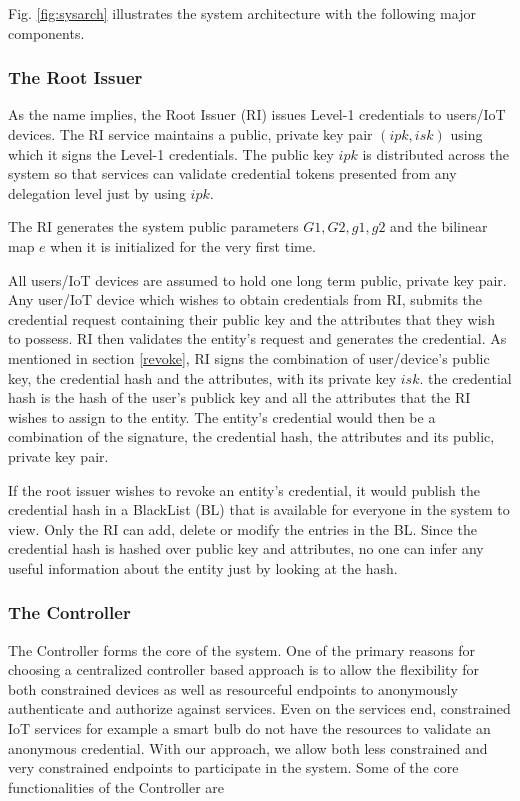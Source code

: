 \documentclass[journal]{IEEEtran}
\begin{document}
Fig. \ref{fig:sysarch} illustrates the system architecture with the following major components.

\subsubsection{The Root Issuer}
As the name implies, the Root Issuer (RI) issues Level-1 credentials to users/IoT devices. The RI service maintains a public, private key pair $(ipk,isk)$ using which it signs the Level-1 credentials. The public key $ipk$ is distributed across the system so that services can validate credential tokens presented from any delegation level just by using $ipk$.

The RI generates the system public parameters $G1, G2, g1, g2$ and the bilinear map $e$ when it is initialized for the very first time.

All users/IoT devices are assumed to hold one long term public, private key pair. Any user/IoT device which wishes to obtain credentials from RI, submits the credential request containing their public key and the attributes that they wish to possess. RI then validates the entity's request and generates the credential. As mentioned in section \ref{revoke}, RI signs the combination of user/device's public key, the credential hash and the attributes, with its private key $isk$. the credential hash is the hash of the user's publick key and all the attributes that the RI wishes to assign to the entity. The entity's credential would then be a combination of the signature, the credential hash, the attributes and its public, private key pair.

If the root issuer wishes to revoke an entity's credential, it would publish the credential hash in a BlackList (BL) that is available for everyone in the system to view. Only the RI can add, delete or modify the entries in the BL. Since the credential hash is hashed over public key and attributes, no one can infer any useful information about the entity just by looking at the hash.

\subsubsection{The Controller} \label{controller}
The Controller forms the core of the system. One of the primary reasons for choosing a centralized controller based approach is to allow the flexibility for both constrained devices as well as resourceful endpoints to anonymously authenticate and authorize against services. Even on the services end, constrained IoT services for example a smart bulb do not have the resources to validate an anonymous credential. With our approach, we allow both less constrained and very constrained endpoints to participate in the system. Some of the core functionalities of the Controller are
\end{document}
